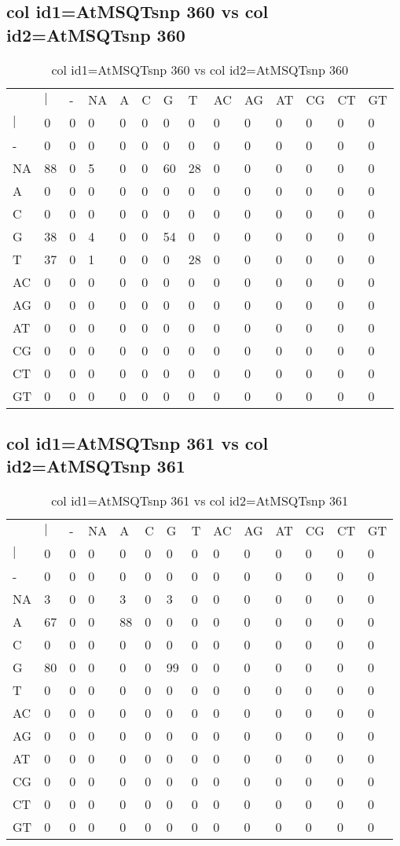 \subsection{col id1=AtMSQTsnp 360 vs col id2=AtMSQTsnp 360}
\begin{center}
\begin{longtable}{|l|l|l|l|l|l|l|l|l|l|l|l|l|l|}
\caption{col id1=AtMSQTsnp 360 vs col id2=AtMSQTsnp 360} \label{table_dm882}\\
\hline
\\
\hline
&$|$&-&NA&A&C&G&T&AC&AG&AT&CG&CT&GT\\
$|$&0&0&0&0&0&0&0&0&0&0&0&0&0\\
-&0&0&0&0&0&0&0&0&0&0&0&0&0\\
NA&88&0&5&0&0&60&28&0&0&0&0&0&0\\
A&0&0&0&0&0&0&0&0&0&0&0&0&0\\
C&0&0&0&0&0&0&0&0&0&0&0&0&0\\
G&38&0&4&0&0&54&0&0&0&0&0&0&0\\
T&37&0&1&0&0&0&28&0&0&0&0&0&0\\
AC&0&0&0&0&0&0&0&0&0&0&0&0&0\\
AG&0&0&0&0&0&0&0&0&0&0&0&0&0\\
AT&0&0&0&0&0&0&0&0&0&0&0&0&0\\
CG&0&0&0&0&0&0&0&0&0&0&0&0&0\\
CT&0&0&0&0&0&0&0&0&0&0&0&0&0\\
GT&0&0&0&0&0&0&0&0&0&0&0&0&0\\
\hline
\end{longtable}
\end{center}

\subsection{col id1=AtMSQTsnp 361 vs col id2=AtMSQTsnp 361}
\begin{center}
\begin{longtable}{|l|l|l|l|l|l|l|l|l|l|l|l|l|l|}
\caption{col id1=AtMSQTsnp 361 vs col id2=AtMSQTsnp 361} \label{table_dm884}\\
\hline
\\
\hline
&$|$&-&NA&A&C&G&T&AC&AG&AT&CG&CT&GT\\
$|$&0&0&0&0&0&0&0&0&0&0&0&0&0\\
-&0&0&0&0&0&0&0&0&0&0&0&0&0\\
NA&3&0&0&3&0&3&0&0&0&0&0&0&0\\
A&67&0&0&88&0&0&0&0&0&0&0&0&0\\
C&0&0&0&0&0&0&0&0&0&0&0&0&0\\
G&80&0&0&0&0&99&0&0&0&0&0&0&0\\
T&0&0&0&0&0&0&0&0&0&0&0&0&0\\
AC&0&0&0&0&0&0&0&0&0&0&0&0&0\\
AG&0&0&0&0&0&0&0&0&0&0&0&0&0\\
AT&0&0&0&0&0&0&0&0&0&0&0&0&0\\
CG&0&0&0&0&0&0&0&0&0&0&0&0&0\\
CT&0&0&0&0&0&0&0&0&0&0&0&0&0\\
GT&0&0&0&0&0&0&0&0&0&0&0&0&0\\
\hline
\end{longtable}
\end{center}

